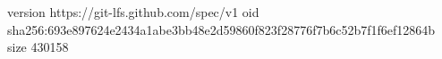 version https://git-lfs.github.com/spec/v1
oid sha256:693e897624e2434a1abe3bb48e2d59860f823f28776f7b6c52b7f1f6ef12864b
size 430158
